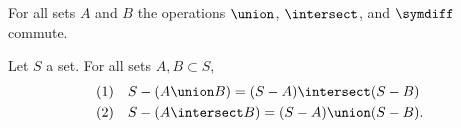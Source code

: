 
\begin{prop}
  For all sets $A$ and $B$ the operations $\union$, $\intersect$, and $\symdiff$ commute.
\end{prop}

\begin{prop}
  Let $S$ a set.
  For all sets $A, B \subset S$,
  \[
    \begin{aligned}
      \text{(1)} \quad & S - (A \union B) = (S - A) \intersect (S - B) \\
      \text{(2)} \quad & S - (A \intersect B) = (S - A) \union (S - B).
    \end{aligned}
  \]
\end{prop}

\strats
